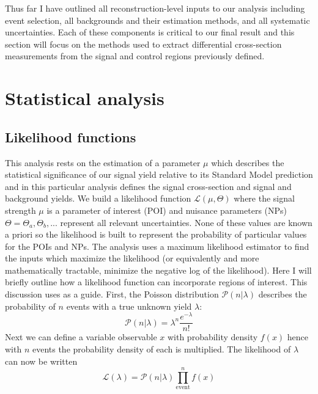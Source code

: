 Thus far I have outlined all reconstruction-level inputs to our analysis including event selection, all backgrounds and their estimation methods, and all systematic uncertainties. Each of these components is critical to our final result and this section will focus on the methods used to extract differential cross-section measurements from the signal and control regions previously defined. 
\section{Statistical analysis}
\subsection{Likelihood functions}
This analysis rests on the estimation of a parameter $\mu$ which describes the statistical significance of our signal yield relative to its Standard Model prediction and in this particular analysis defines the signal cross-section and signal and background yields. We build a likelihood function $\mathcal{L}(\mu,\Theta)$ where the signal strength $\mu$ is a parameter of interest (POI) and nuisance parameters (NPs) $\Theta=\Theta_a,\Theta_b,...$ represent all relevant uncertainties. None of these values are known a priori so the likelihood is built to represent the probability of particular values for the POIs and NPs. The analysis uses a maximum likelihood estimator to find the inputs which maximize the likelihood (or equivalently and more mathematically tractable, minimize the negative log of the likelihood). Here I will briefly outline how a likelihood function can incorporate regions of interest. This discussion uses \cite{cranmer2015practical} as a guide. First, the Poisson distribution $\mathcal{P}(n|\lambda)$ describes the probability of $n$ events with a true unknown yield $\lambda$:
\begin{equation}
\mathcal{P}(n|\lambda)= \lambda^n\frac{e^{-\lambda}}{n!}
\end{equation}
Next we can define a variable observable $x$ with probability density $f(x)$ hence with $n$ events the probability density of each is multiplied. The likelihood of $\lambda$ can now be written
\begin{equation}
\mathcal{L}(\lambda)=\mathcal{P}(n|\lambda)\prod_{\text{event}}^n f(x)
\end{equation}
